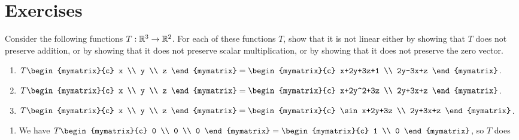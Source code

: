\section*{Exercises}

\begin{ex}
  Consider the following functions $T:\mathbb{R}^3\rightarrow \mathbb{R}^2$.
  For each of these functions $T$, show that it is not linear either
  by showing that $T$ does not preserve addition, or by showing that it
  does not preserve scalar multiplication, or by showing that it does
  not preserve the zero vector.
  \begin{enumerate}
  \item $T\begin{mymatrix}{c} x \\ y \\ z \end{mymatrix}
    = \begin{mymatrix}{c}
      x+2y+3z+1 \\
      2y-3x+z
    \end{mymatrix}$.
  \item $T\begin{mymatrix}{c} x \\ y \\ z \end{mymatrix}
    = \begin{mymatrix}{c}
      x+2y^2+3z \\
      2y+3x+z
    \end{mymatrix}$.
  \item $T\begin{mymatrix}{c} x \\ y \\ z \end{mymatrix}
    = \begin{mymatrix}{c}
      \sin x+2y+3z \\
      2y+3x+z
    \end{mymatrix}$.
  \end{enumerate}
  \begin{sol}
    \begin{enumerate}
    \item We have $T\begin{mymatrix}{c} 0 \\ 0 \\ 0 \end{mymatrix}
      = \begin{mymatrix}{c} 1 \\ 0 \end{mymatrix}$, so $T$ does

\end{enumerate}
\end{sol}
\end{ex}
